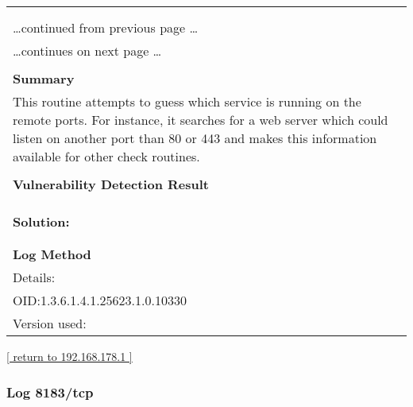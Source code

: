 \documentclass{article}
\begin{document}
\begin{longtable}{|p{}|}
\hline
\rowcolor{gvm_log}{\color{white}{Log (CVSS: 0.0) }}\\
\rowcolor{gvm_log}{\color{white}{NVT: Services}}\\
\hline
\endfirsthead
\hfill\ldots continued from previous page \ldots \\
\hline
\endhead
\hline
\ldots continues on next page \ldots \\
\endfoot
\hline
\endlastfoot
\\
\textbf{Summary}\\
This routine attempts to guess which service is running on the
  remote ports. For instance, it searches for a web server which could listen on another port than
  80 or 443 and makes this information available for other check routines.\\

        \hline
        \\
\textbf{Vulnerability Detection Result}\\
\rowcolor{white}{\verb=The service closed the connection after 3 seconds without sending any data=}\\
\rowcolor{white}{\verb=It might be protected by some TCP wrapper=}\\

          \hline
          \\
\textbf{Solution:}\\
\\


        \hline
        \\
\textbf{Log Method}\\
Details:
\rowcolor{white}{\verb=Services=}\\
OID:1.3.6.1.4.1.25623.1.0.10330\\
Version used:
\rowcolor{white}{\verb=2021-03-15T10:42:03Z=}\\
\end{longtable}

\begin{footnotesize}\hyperref[host:192.168.178.1]{[ return to 192.168.178.1 ]}\end{footnotesize}
\subsubsection{Log 8183/tcp}
\label{port:192.168.178.1 8183/tcp Log}
\end{document}

